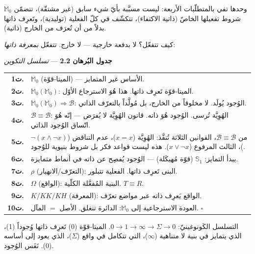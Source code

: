 \documentclass[10pt, openany, oneside]{book}
\begin{document}
\noindent $\mathbb{M}_0$ وحدها تفي بالمتطلّبات الأربعة: ليست مسبَّبة بأيّ شيء سابق (غير مشتقّة)، تتضمّن شروط تفعيلها الخاصّ (ذاتية الاكتفاء)، تتكشّف في كلّ الفعلية (توليدية)، وتَعرِف ذاتها بدلاً من أن تُعرَف من الخارج (ذاتية).

كيف تتفعّل؟ لا بدفعة خارجية --- لا خارج. تتفعّل \textit{بمعرفة ذاتها}:

\vspace{0.5em}

\textbf{جدول البُرهان 2.2} --- \textit{تسلسل التكوين}

\vspace{0.5em}

\noindent\begin{tabular}{r p{}}
\textbf{ت1.} & $\mathbb{M}_0$ (الميتا-قوّة) --- الأساس غير المتمايز. \\[0.3em]
\textbf{ت2.} & $\mathbb{M}_0(\mathbb{M}_0)$: الميتا-قوّة تَعرِف ذاتها. هذا هُوَ الاسترجاع الأوّل. \\[0.3em]
\textbf{ت3.} & $\mathbb{M}_0(\mathbb{M}_0) \Rightarrow \mathcal{B}$: الوُجود يُولَد. لا مخلوقاً من الخارج، بل مُولَّداً بالتعرّف الذاتي. \\[0.3em]
\textbf{ت4.} & $\mathcal{B} \equiv \mathcal{B}$: الهُوِيَّة تُرسى. الوُجود هُوَ ذاته. قانون الهُوِيَّة لا يُفرَض --- إنّه هُوَ اتّساق الوُجود الذاتي. \\[0.3em]
\textbf{ت5.} & من $\mathcal{B} \equiv \mathcal{B}$، القوانين الثلاثة تُنفَّذ: الهُوِيَّة ($x = x$)، عدم التناقض ($\neg(x \wedge \neg x)$)، الثالث المرفوع ($x \vee \neg x$). هذه ليست قواعد فكر بل شروط بنيوية للوُجود. \\[0.3em]
\textbf{ت6.} & يبدأ التمايز: $\mathbb{S}_1$ (قوّة مُهيكَلة) --- الوُجود يُفصِح عن ذاته في أنماط متمايزة. \\[0.3em]
\textbf{ت7.} & $\rho$ (التعرّف/الانهيار): البنى تَعرِف ذاتها. الفعلية تتبلور. \\[0.3em]
\textbf{ت8.} & $\Omega$ (الواقع): البنية المُفعَّلة الكلّية. $T \equiv R$. \\[0.3em]
\textbf{ت9.} & $K/KK/KH$ (المعرفة): الواقع يَعرِف ذاته عبر مواضع تعرّف. \\[0.3em]
\textbf{ت10.} & العودة الاسترجاعية إلى $\mathbb{M}_0$: الدائرة تنغلق. الأصل $=$ المآل. $\square$ \\[0.3em]
\end{tabular}

\vspace{0.8em}

\noindent التسلسل الكَونوغينيّ: $0 \to 1 \to \infty \to \Sigma \to 0$. الميتا-قوّة (0) تَعرِف ذاتها وُجوداً (1)، الذي يتمايز في بنية لا متناهية ($\infty$)، التي تتكامل في واقع ($\Sigma$)، الذي يعود إلى أساسه (0). نَفَس الوُجود.
\end{document}
